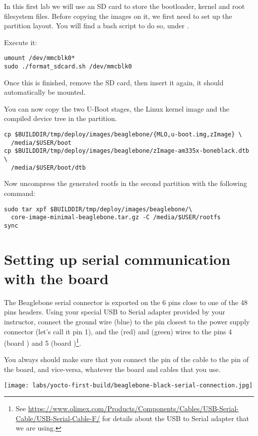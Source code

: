 In this first lab we will use an SD card to store the bootloader, kernel and
root filesystem files. Before copying the images on it, we first need to set up the
partition layout. You will find a bash script to do so, under
.

Execute it:
\begin{verbatim}
umount /dev/mmcblk0*
sudo ./format_sdcard.sh /dev/mmcblk0
\end{verbatim}

Once this is finished, remove the SD card, then insert it again, it
should automatically be mounted.

You can now copy the two U-Boot stages, the Linux kernel image and the compiled
device tree in the  partition.
\begin{verbatim}
cp $BUILDDIR/tmp/deploy/images/beaglebone/{MLO,u-boot.img,zImage} \
  /media/$USER/boot
cp $BUILDDIR/tmp/deploy/images/beaglebone/zImage-am335x-boneblack.dtb \
  /media/$USER/boot/dtb
\end{verbatim}

Now uncompress the generated rootfs in the second partition with the
following  command:
\begin{verbatim}
sudo tar xpf $BUILDDIR/tmp/deploy/images/beaglebone/\
  core-image-minimal-beaglebone.tar.gz -C /media/$USER/rootfs
sync
\end{verbatim}

\section{Setting up serial communication with the board}

The Beaglebone serial connector is exported on the 6 pins close to one
of the 48 pins headers. Using your special USB to Serial adapter provided
by your instructor, connect the ground wire (blue) to the pin closest
to the power supply connector (let's call it pin 1), and the \code{TX} (red)
and \code{RX} (green) wires to the pins 4 (board \code{RX}) and
5 (board \code{TX})\footnote{See
\url{https://www.olimex.com/Products/Components/Cables/USB-Serial-Cable/USB-Serial-Cable-F/}
for details about the USB to Serial adapter that we are using.}.

You always should make sure that you connect the \code{TX} pin of the cable
to the \code{RX} pin of the board, and vice-versa, whatever the board and
cables that you use.

\begin{center}
\texttt{[image: labs/yocto-first-build/beaglebone-black-serial-connection.jpg]}
\end{center}

